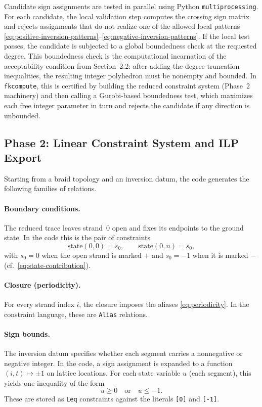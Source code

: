 \documentclass[twocolumn]{article}
\begin{document}
Candidate sign assignments are tested in parallel using Python
\texttt{multiprocessing}.
For each candidate, the local validation step computes the crossing sign matrix
and rejects assignments that do not realize one of the allowed local patterns
\eqref{eq:positive-inversion-patterns}--\eqref{eq:negative-inversion-patterns}.
If the local test passes, the candidate is subjected to a global boundedness
check at the requested degree.
This boundedness check is the computational incarnation of the acceptability
condition from Section~2.2: after adding the degree truncation inequalities, the
resulting integer polyhedron must be nonempty and bounded.
In \texttt{fkcompute}, this is certified by building the reduced constraint
system (Phase~2 machinery) and then calling a Gurobi-based boundedness test,
which maximizes each free
integer parameter in turn and rejects the candidate if any direction is
unbounded.

\subsection{Phase 2: Linear Constraint System and ILP Export}

Starting from a braid topology and an inversion datum, the code generates the
following families of relations.

\paragraph{Boundary conditions.}
The reduced trace leaves strand~0 open and fixes its endpoints to the ground
state.  In the code this is the pair of constraints
\begin{equation}\label{eq:boundary}
  \mathrm{state}(0,0)=s_0,\qquad \mathrm{state}(0,n)=s_0,
\end{equation}
with \(s_0=0\) when the open strand is marked \(+\) and \(s_0=-1\) when it is
marked \(-\) (cf.~\eqref{eq:state-contribution}).

\paragraph{Closure (periodicity).}
For every strand index \(i\), the closure imposes the aliases
\eqref{eq:periodicity}.
In the constraint language, these are \texttt{Alias} relations.

\paragraph{Sign bounds.}
The inversion datum specifies whether each segment carries a nonnegative or
negative integer.
In the code, a sign assignment is expanded to a function
\((i,t)\mapsto \pm 1\) on lattice locations.
For each state variable \(u\) (each segment), this yields one inequality of the
form
\begin{equation}\label{eq:sign-bounds}
  u\ge 0\quad\text{or}\quad u\le -1.
\end{equation}
These are stored as \texttt{Leq} constraints against the literals
\texttt{[0]} and \texttt{[-1]}.
\end{document}
